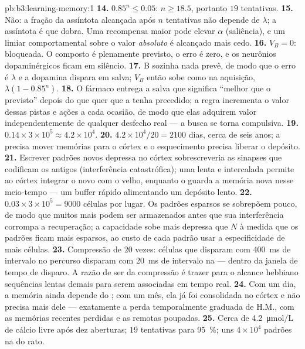 \begin{solution}{pb:b3:learning-memory:1}
\textbf{14.} $0.85^{n} \le 0.05$: $n \ge 18.5$, portanto $19$ tentativas.
\textbf{15.} Não: a fração da assíntota alcançada após $n$ tentativas não
depende de $\lambda$; a assíntota é que dobra. Uma recompensa maior pode
elevar $\alpha$ (saliência), e um limiar comportamental sobre o valor
\emph{absoluto} é alcançado mais cedo.
\textbf{16.} $V_{B} = 0$: bloqueada. O composto é plenamente previsto, o
erro é zero, e os neurônios dopaminérgicos ficam em silêncio.
\textbf{17.} B sozinha nada prevê, de modo que o erro é $\lambda$ e a
dopamina dispara em salva; $V_{B}$ então sobe como na aquisição,
$\lambda(1 -
0.85^{n})$.
\textbf{18.} O fármaco entrega a salva que significa ``melhor que o
previsto'' depois do que quer que a tenha precedido; a regra incrementa o
valor dessas pistas e ações a cada ocasião, de modo que elas adquirem
valor independentemente de qualquer desfecho real --- a busca se torna
compulsiva.
\textbf{19.} $0.14\times 3\times 10^{5} \approx 4.2\times 10^{4}$.
\textbf{20.} $4.2\times 10^{4}/20 = 2100$ dias, cerca de seis anos; a
 precisa mover memórias para o córtex e o esquecimento
precisa liberar o depósito.
\textbf{21.} Escrever padrões novos depressa no córtex sobrescreveria as
sinapses que codificam os antigos (interferência catastrófica); uma
 lenta e intercalada permite ao córtex integrar o novo com o
velho, enquanto o  guarda a memória nova nesse meio-tempo ---
um buffer rápido alimentando um depósito lento.
\textbf{22.} $0.03\times 3\times 10^{5} = 9000$ células por lugar. Os
padrões esparsos se sobrepõem pouco, de modo que muitos mais podem ser
armazenados antes que sua interferência corrompa a recuperação; a
capacidade sobe mais depressa que $N$ à medida que os padrões ficam mais
esparsos, ao custo de cada padrão usar a especificidade de mais células.
\textbf{23.} Compressão de $20$ vezes: células que disparam com
\qty{400}{ms} de intervalo no percurso disparam com \qty{20}{ms} de
intervalo na  --- dentro da janela de tempo de disparo. A razão
de ser da compressão é trazer para o alcance hebbiano sequências lentas
demais para serem associadas em tempo real.
\textbf{24.} Com um dia, a memória ainda depende do ; com um
mês, ela já foi consolidada no córtex e não precisa mais dele --- exatamente
a perda temporalmente graduada de H.M., com as memórias recentes perdidas
e as remotas poupadas.
\textbf{25.} Cerca de \qty{4.2}{\micro mol/L} de cálcio livre após dez
aberturas; $19$ tentativas para \qty{95}{\%}; uns $4\times 10^{4}$
padrões na  do rato.
\end{solution}
